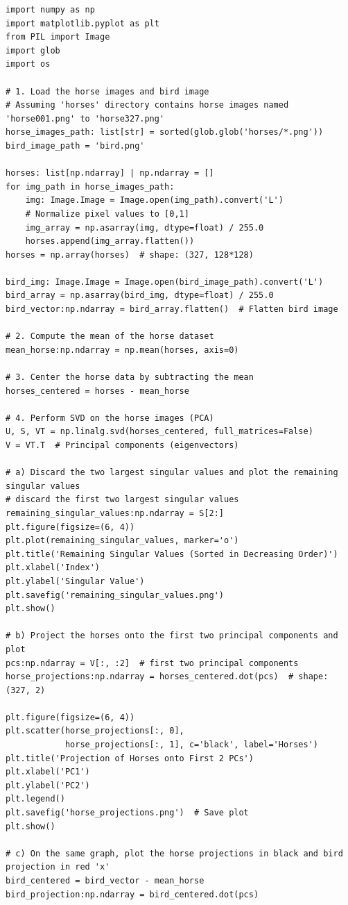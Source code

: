 \documentclass{article}
\begin{document}
\begin{verbatim}
import numpy as np
import matplotlib.pyplot as plt
from PIL import Image
import glob
import os

# 1. Load the horse images and bird image
# Assuming 'horses' directory contains horse images named 'horse001.png' to 'horse327.png'
horse_images_path: list[str] = sorted(glob.glob('horses/*.png'))
bird_image_path = 'bird.png'

horses: list[np.ndarray] | np.ndarray = []
for img_path in horse_images_path:
    img: Image.Image = Image.open(img_path).convert('L')
    # Normalize pixel values to [0,1]
    img_array = np.asarray(img, dtype=float) / 255.0
    horses.append(img_array.flatten())
horses = np.array(horses)  # shape: (327, 128*128)

bird_img: Image.Image = Image.open(bird_image_path).convert('L')
bird_array = np.asarray(bird_img, dtype=float) / 255.0
bird_vector:np.ndarray = bird_array.flatten()  # Flatten bird image

# 2. Compute the mean of the horse dataset
mean_horse:np.ndarray = np.mean(horses, axis=0)

# 3. Center the horse data by subtracting the mean
horses_centered = horses - mean_horse

# 4. Perform SVD on the horse images (PCA)
U, S, VT = np.linalg.svd(horses_centered, full_matrices=False)
V = VT.T  # Principal components (eigenvectors)

# a) Discard the two largest singular values and plot the remaining singular values
# discard the first two largest singular values
remaining_singular_values:np.ndarray = S[2:]
plt.figure(figsize=(6, 4))
plt.plot(remaining_singular_values, marker='o')
plt.title('Remaining Singular Values (Sorted in Decreasing Order)')
plt.xlabel('Index')
plt.ylabel('Singular Value')
plt.savefig('remaining_singular_values.png')
plt.show()

# b) Project the horses onto the first two principal components and plot
pcs:np.ndarray = V[:, :2]  # first two principal components
horse_projections:np.ndarray = horses_centered.dot(pcs)  # shape: (327, 2)

plt.figure(figsize=(6, 4))
plt.scatter(horse_projections[:, 0],
            horse_projections[:, 1], c='black', label='Horses')
plt.title('Projection of Horses onto First 2 PCs')
plt.xlabel('PC1')
plt.ylabel('PC2')
plt.legend()
plt.savefig('horse_projections.png')  # Save plot
plt.show()

# c) On the same graph, plot the horse projections in black and bird projection in red 'x'
bird_centered = bird_vector - mean_horse
bird_projection:np.ndarray = bird_centered.dot(pcs)


\end{verbatim}
\end{document}
